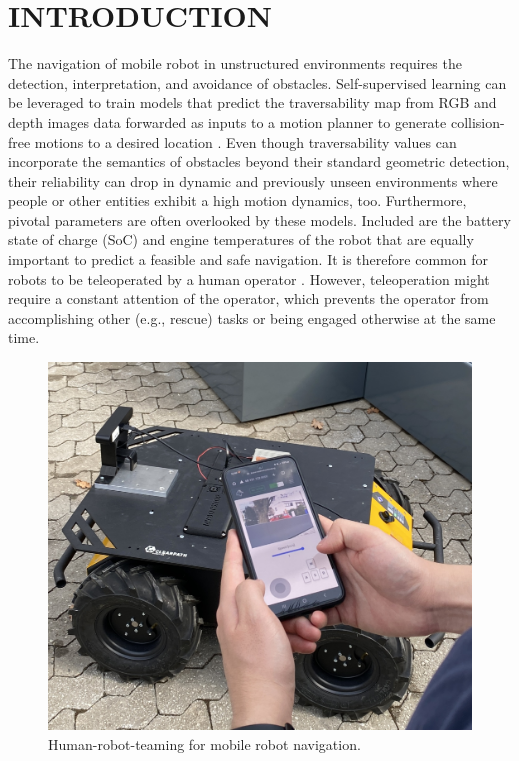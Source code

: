 \documentclass[letterpaper, 10 pt, conference]{ieeeconf}  %
\begin{document}
\section{INTRODUCTION}
The navigation of mobile robot in unstructured environments requires the detection, interpretation, and avoidance of obstacles.  
Self-supervised learning can be leveraged to train  models that predict the traversability map from RGB and depth images data forwarded as inputs to a motion planner to generate collision-free motions to a desired location \cite{wayfaster,wayfast,leung2022hybrid,endo2024benchnav}. 
Even though traversability values can incorporate the semantics of obstacles beyond their standard geometric detection, their reliability can drop in dynamic and previously unseen environments \cite{frey2024roadrunner,muhamad2024robust} where people or other entities exhibit a high motion dynamics, too. Furthermore, pivotal parameters are often overlooked by these models. Included are the battery state of charge (SoC) and engine temperatures of the robot that are equally important to predict a feasible and safe navigation. It is therefore common for robots to be  teleoperated by a human operator \cite{huang2024evaluation,husky}. However, teleoperation might require a constant attention of the operator, which prevents the operator from accomplishing other (e.g., rescue) tasks or being engaged otherwise at the same time.


\begin{figure}[t]
	\centerline{\includegraphics[width=0.95\columnwidth]{images/galaxycontrol.jpg}}
	\caption{Human-robot-teaming for mobile robot navigation.}
	\label{fig:galaxycontrol}
\end{figure}
\end{document}
